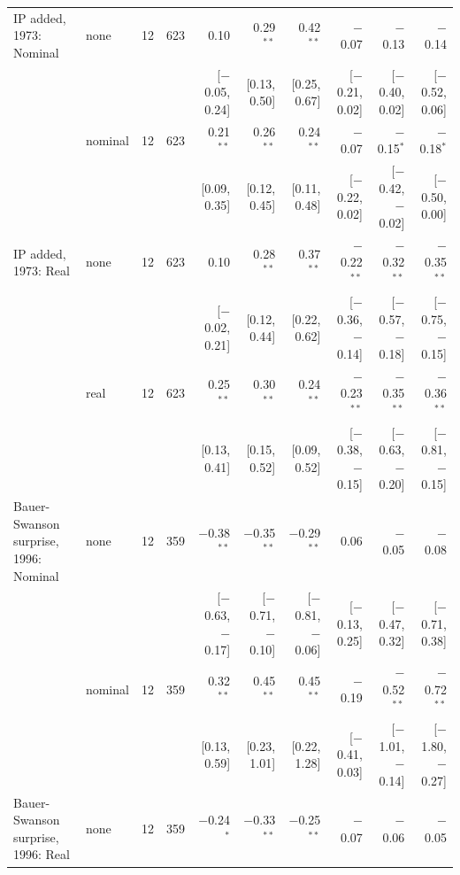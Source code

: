 \begin{table}[tp]
{\begin{tabular}{llcrrrrrrr}
\addlinespace
IP added, 1973: Nominal & none & 12 & 623 & 0.10 & 0.29$^{**}$ & 0.42$^{**}$ & $-$0.07 & $-$0.13 & $-$0.14\\
 & & & & {\scriptsize [$-$0.05, 0.24]} & {\scriptsize [0.13, 0.50]} & {\scriptsize [0.25, 0.67]} & {\scriptsize [$-$0.21, 0.02]} & {\scriptsize [$-$0.40, 0.02]} & {\scriptsize [$-$0.52, 0.06]}\\
 & nominal & 12 & 623 & 0.21$^{**}$ & 0.26$^{**}$ & 0.24$^{**}$ & $-$0.07 & $-$0.15$^{*}$ & $-$0.18$^{*}$\\
 & & & & {\scriptsize [0.09, 0.35]} & {\scriptsize [0.12, 0.45]} & {\scriptsize [0.11, 0.48]} & {\scriptsize [$-$0.22, 0.02]} & {\scriptsize [$-$0.42, $-$0.02]} & {\scriptsize [$-$0.50, 0.00]}\\
\addlinespace
IP added, 1973: Real & none & 12 & 623 & 0.10 & 0.28$^{**}$ & 0.37$^{**}$ & $-$0.22$^{**}$ & $-$0.32$^{**}$ & $-$0.35$^{**}$\\
 & & & & {\scriptsize [$-$0.02, 0.21]} & {\scriptsize [0.12, 0.44]} & {\scriptsize [0.22, 0.62]} & {\scriptsize [$-$0.36, $-$0.14]} & {\scriptsize [$-$0.57, $-$0.18]} & {\scriptsize [$-$0.75, $-$0.15]}\\
 & real & 12 & 623 & 0.25$^{**}$ & 0.30$^{**}$ & 0.24$^{**}$ & $-$0.23$^{**}$ & $-$0.35$^{**}$ & $-$0.36$^{**}$\\
 & & & & {\scriptsize [0.13, 0.41]} & {\scriptsize [0.15, 0.52]} & {\scriptsize [0.09, 0.52]} & {\scriptsize [$-$0.38, $-$0.15]} & {\scriptsize [$-$0.63, $-$0.20]} & {\scriptsize [$-$0.81, $-$0.15]}\\
\addlinespace
Bauer-Swanson surprise, 1996: Nominal & none & 12 & 359 & $-$0.38$^{**}$ & $-$0.35$^{**}$ & $-$0.29$^{**}$ & 0.06 & $-$0.05 & $-$0.08\\
 & & & & {\scriptsize [$-$0.63, $-$0.17]} & {\scriptsize [$-$0.71, $-$0.10]} & {\scriptsize [$-$0.81, $-$0.06]} & {\scriptsize [$-$0.13, 0.25]} & {\scriptsize [$-$0.47, 0.32]} & {\scriptsize [$-$0.71, 0.38]}\\
 & nominal & 12 & 359 & 0.32$^{**}$ & 0.45$^{**}$ & 0.45$^{**}$ & $-$0.19 & $-$0.52$^{**}$ & $-$0.72$^{**}$\\
 & & & & {\scriptsize [0.13, 0.59]} & {\scriptsize [0.23, 1.01]} & {\scriptsize [0.22, 1.28]} & {\scriptsize [$-$0.41, 0.03]} & {\scriptsize [$-$1.01, $-$0.14]} & {\scriptsize [$-$1.80, $-$0.27]}\\
\addlinespace
Bauer-Swanson surprise, 1996: Real & none & 12 & 359 & $-$0.24$^{*}$ & $-$0.33$^{**}$ & $-$0.25$^{**}$ & $-$0.07 & $-$0.06 & $-$0.05\\

\end{tabular}}
\end{table}
